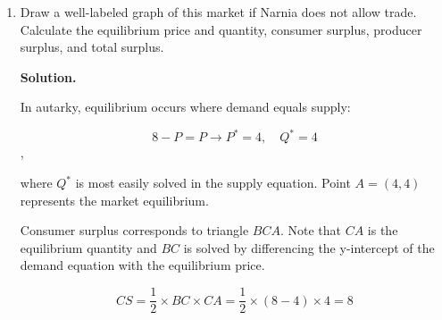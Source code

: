 \documentclass[12pt]{article}
\newenvironment{solution}{\par\noindent\textbf{Solution.}\par}{\vspace{1em}}
\begin{document}
\begin{enumerate}[label=(\alph*)]
\item Draw a well-labeled graph of this market if Narnia does not allow trade. 
Calculate the equilibrium price and quantity, consumer surplus, producer surplus, 
and total surplus.
\begin{solution}

\begin{center}
\end{center}

In autarky, equilibrium occurs where demand equals supply: 

$$8 - P = P \rightarrow P^* = 4, \quad Q^* = 4$$, 

where $Q^*$ is most easily solved in the supply equation. Point $A=(4,4)$ represents the market equilibrium.

\medskip

Consumer surplus corresponds to triangle $BCA$. Note that $CA$ is the equilibrium quantity and $BC$ is solved by differencing the y-intercept of the demand equation with the equilibrium price.

$$
CS = \frac{1}{2}\times BC \times CA = \frac 1 2 \times (8-4) \times 4 = 8
$$


\medskip


\end{solution}
\end{enumerate}
\end{document}
